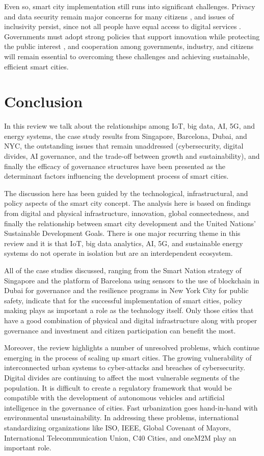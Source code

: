 \documentclass[pdflatex,sn-mathphys-num]{sn-jnl}%
\theoremstyle{thmstyleone}%
\theoremstyle{thmstyletwo}%
\theoremstyle{thmstylethree}%
\begin{document}
Even so, smart city implementation still runs into significant challenges. Privacy and data security remain major concerns for many citizens \cite{r100}, and issues of inclusivity persist, since not all people have equal access to digital services \cite{r101}. Governments must adopt strong policies that support innovation while protecting the public interest \cite{r30}, and cooperation among governments, industry, and citizens will remain essential to overcoming these challenges and achieving sustainable, efficient smart cities.

\section{Conclusion}
In this review we talk about the relationships among IoT, big data, AI, 5G, and energy systems, the case study results from Singapore, Barcelona, Dubai, and NYC, the outstanding issues that remain unaddressed (cybersecurity, digital divides, AI governance, and the trade-off between growth and sustainability), and finally the efficacy of governance structures have been presented as the determinant factors influencing the development process of smart cities.

The discussion here has been guided by the technological, infrastructural, and policy aspects of the smart city concept. The analysis here is based on findings from digital and physical infrastructure, innovation, global connectedness, and finally the relationship between smart city development and the United Nations' Sustainable Development Goals. There is one major recurring theme in this review and it is that IoT, big data analytics, AI, 5G, and sustainable energy systems do not operate in isolation but are an interdependent ecosystem.

All of the case studies discussed, ranging from the Smart Nation strategy of Singapore and the platform of Barcelona using sensors to the use of blockchain in Dubai for governance and the resilience programs in New York City for public safety, indicate that for the successful implementation of smart cities, policy making plays as important a role as the technology itself. Only those cities that have a good combination of physical and digital infrastructure along with proper governance and investment and citizen participation can benefit the most.

Moreover, the review highlights a number of unresolved problems, which continue emerging in the process of scaling up smart cities. The growing vulnerability of interconnected urban systems to cyber-attacks and breaches of cybersecurity. Digital divides are continuing to affect the most vulnerable segments of the population. It is difficult to create a regulatory framework that would be compatible with the development of autonomous vehicles and artificial intelligence in the governance of cities. Fast urbanization goes hand-in-hand with environmental unsustainability. In addressing these problems, international standardizing organizations like ISO, IEEE, Global Covenant of Mayors, International Telecommunication Union, C40 Cities, and oneM2M play an important role.
\end{document}
